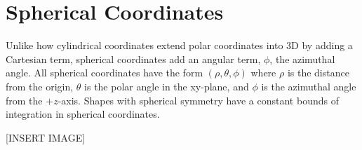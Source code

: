 \section{Spherical Coordinates}
\noindent
Unlike how cylindrical coordinates extend polar coordinates into 3D by adding a Cartesian term, spherical coordinates add an angular term, $\phi$, the azimuthal angle. All spherical coordinates have the form $(\rho, \theta, \phi)$ where $\rho$ is the distance from the origin, $\theta$ is the polar angle in the xy-plane, and $\phi$ is the azimuthal angle from the $+z$-axis. Shapes with spherical symmetry have a constant bounds of integration in spherical coordinates.

[INSERT IMAGE]


